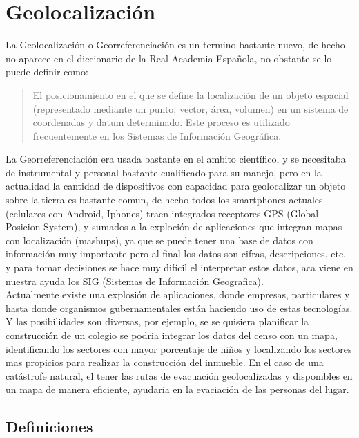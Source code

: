 \chapter{Geolocalizaci\'on} %
\label{cha:geolocalizacion}
  La Geolocalizaci\'on o Georreferenciación es un termino bastante nuevo, de hecho no aparece en el diccionario de la Real Academia Espa\~nola, no obstante se lo puede definir como:
  \begin{quote}
    El posicionamiento en el que se define la localización de un objeto espacial (representado mediante un punto, vector, área, volumen) en un sistema de coordenadas y datum determinado. Este proceso es utilizado frecuentemente en los Sistemas de Información Geográfica.
  \end{quote}


  La Georreferenciación era usada bastante en el ambito científico, y se necesitaba de instrumental y personal bastante cualificado para su manejo, pero en la actualidad la cantidad de dispositivos con capacidad para geolocalizar un objeto sobre la tierra es bastante comun, de hecho todos los smartphones actuales (celulares con Android, Iphones) traen integrados receptores GPS (Global Posicion System),  y sumados a la exploci\'on de aplicaciones  que integran mapas con localizaci\'on (mashups), ya que se puede tener una base de datos con informaci\'on muy importante pero al final  los datos son cifras, descripciones, etc. y para tomar decisiones se hace muy difícil el interpretar estos datos, aca viene en nuestra ayuda los SIG (Sistemas de Informaci\'on Geografica).\\

  Actualmente existe una explosi\'on de aplicaciones, donde empresas, particulares y hasta donde organismos gubernamentales est\'an haciendo uso de estas tecnologías.
  Y las posibilidades son diversas, por ejemplo, se se quisiera planificar la construcci\'on de un colegio se podria integrar los datos del censo con un mapa, identificando los sectores con mayor porcentaje de ni\~nos y localizando los sectores mas propicios para realizar la construcción del inmueble. En el caso de una catástrofe natural, el tener las rutas de evacuaci\'on geolocalizadas y disponibles en un mapa de manera eficiente,  ayudaria en la evaciaci\'on de las personas del lugar.\\ 

   
  \section{Definiciones} %
  \label{sec:definiciones}
  
